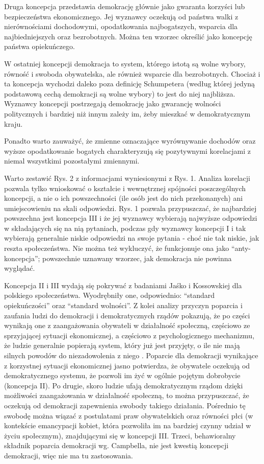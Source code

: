 \documentclass[12pt]{article}
\begin{document}
Druga koncepcja przedstawia demokrację głównie jako gwaranta korzyści lub bezpieczeństwa ekonomicznego. Jej wyznawcy oczekują od państwa walki z nierównościami dochodowymi, opodatkowania najbogatszych, wsparcia dla najbiedniejszych oraz bezrobotnych. Można ten wzorzec określić jako koncepcję państwa opiekuńczego.

W ostatniej koncepcji demokracja to system, którego istotą są wolne wybory, równość i swoboda obywatelska, ale również wsparcie dla bezrobotnych. Chociaż i ta koncepcja wychodzi daleko poza definicję Schumpetera (według której jedyną podstawową cechą demokracji są wolne wybory) to jest do niej najbliższa. Wyznawcy koncepcji postrzegają demokrację jako gwarancję wolności politycznych i bardziej niż innym zależy im, żeby mieszkać w demokratycznym kraju.

Ponadto warto zauważyć, że zmienne oznaczające wyrównywanie dochodów oraz wyższe opodatkowanie bogatych charakteryzują się pozytywnymi korelacjami z niemal wszystkimi pozostałymi zmiennymi.

Warto zestawić Rys. 2 z informacjami wyniesionymi z Rys. 1. Analiza korelacji pozwala tylko wnioskować o kształcie i wewnętrznej spójności poszczególnych koncepcji, a nie o ich powszechności (ile osób jest do nich przekonanych) ani umiejscowieniu na skali odpowiedzi. Rys. 1 pozwala przypuszczać, że najbardziej powszechna jest koncepcja III i że jej wyznawcy wybierają najwyższe odpowiedzi w składających się na nią pytaniach, podczas gdy wyznawcy koncepcji I i tak wybierają generalnie niskie odpowiedzi na swoje pytania - choć nie tak niskie, jak reszta społeczeństwa. Nie można też wykluczyć, że funkcjonuje ona jako ``anty-koncepcja''; powszechnie uznawany wzorzec, jak demokracja nie powinna wyglądać.

Koncepcja II i III wydają się pokrywać z badaniami Jaśko i Kossowskiej \citeyearpar{JaskoKoss} dla polskiego społeczeństwa. Wyodrębniły one, odpowiednio: ``standard opiekuńczości'' oraz ``standard wolności''. Z kolei analizy przyczyn poparcia i zaufania ludzi do demokracji i demokratycznych rządów pokazują, że po części wynikają one z zaangażowania obywateli w działalność społeczną, częściowo ze sprzyjającej sytuacji ekonomicznej, a częściowo z psychologicznego mechanizmu, że ludzie generalnie popierają system, który już jest przyjęty, o ile nie mają silnych powodów do niezadowolenia z niego \citep{Campbell}. Poparcie dla demokracji wynikające z korzystnej sytuacji ekonomicznej jasno potwierdza, że obywatele oczekują od demokratycznego systemu, że pozwoli im żyć w ogólnie pojętym dobrobycie (koncepcja II). Po drugie, skoro ludzie ufają demokratycznym rządom dzięki możliwości zaangażowania w działalność społeczną, to można przypuszczać, że oczekują od demokracji zapewnienia swobody takiego działania. Pośrednio tę swobodę można wiązać z postulatami praw obywatelskich oraz równości płci (w kontekście emancypacji kobiet, która pozwoliła im na bardziej czynny udział w życiu społecznym), znajdującymi się w koncepcji III. Trzeci, behawioralny składnik poparcia demokracji wg. Campbella, nie jest kwestią koncepcji demokracji, więc nie ma tu zastosowania.
\end{document}
